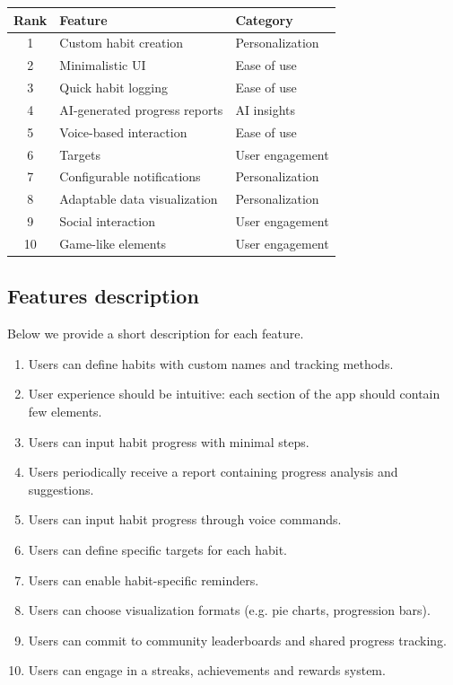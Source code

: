 \documentclass{article}
\begin{document}
\begin{table}[H]
	\centering
	\begin{tabularx}{0.9\textwidth}{c|X|X}
		\hline
		\textbf{Rank} & \textbf{Feature}              & \textbf{Category} \\
		\hline
		1             & Custom habit creation         & Personalization   \\
		2             & Minimalistic UI               & Ease of use       \\
		3             & Quick habit logging           & Ease of use       \\
		4             & AI-generated progress reports & AI insights       \\
		5             & Voice-based interaction       & Ease of use       \\
		6             & Targets                       & User engagement   \\
		7             & Configurable notifications    & Personalization   \\
		8             & Adaptable data visualization  & Personalization   \\
		9             & Social interaction            & User engagement   \\
		10            & Game-like elements            & User engagement   \\
		\hline
	\end{tabularx}
\end{table}

\subsection{Features description}

Below we provide a short description for each feature.

\begin{enumerate}
	\item Users can define habits with custom names and tracking methods.
	\item User experience should be intuitive: each section of the app should contain few elements.
	\item Users can input habit progress with minimal steps.
	\item Users periodically receive a report containing progress analysis and suggestions.
	\item Users can input habit progress through voice commands.
	\item Users can define specific targets for each habit.
	\item Users can enable habit-specific reminders.
	\item Users can choose visualization formats (e.g. pie charts, progression bars).
	\item Users can commit to community leaderboards and shared progress tracking.
	\item Users can engage in a streaks, achievements and rewards system.
\end{enumerate}
\end{document}
